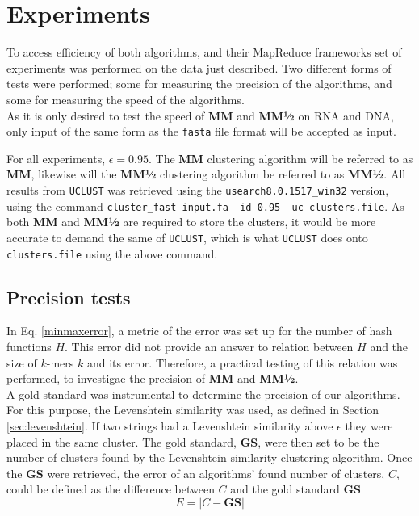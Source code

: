 \documentclass[../../main.tex]{subfiles}
\begin{document}
\section{Experiments}

To access efficiency of both algorithms, and their MapReduce frameworks set of experiments was performed on the data just described. Two different forms of tests were performed; some for measuring the precision of the algorithms, and some for measuring the speed of the algorithms.\\

As it is only desired to test the speed of {\bf MM} and {\bf MM½} on RNA and DNA, only input of the same form as the \texttt{fasta} file format will be accepted as input.
 
For all experiments, $\epsilon=0.95$. The {\bf MM} clustering algorithm will be referred to as {\bf MM}, likewise will the {\bf MM½} clustering algorithm be referred to as {\bf MM½}. All results from {\tt UCLUST} was retrieved using the {\tt usearch8.0.1517\_win32} version, using the command {\tt cluster\_fast input.fa -id 0.95 -uc clusters.file}. As both {\bf MM} and {\bf MM½} are required to store the clusters, it would be more accurate to demand the same of {\tt UCLUST}, which is what {\tt UCLUST} does onto {\tt clusters.file} using the above command.

\subsection{Precision tests}

In Eq. \ref{minmaxerror}, a metric of the error was set up for the number of hash functions $H$. This error did not provide an answer to relation between $H$ and the size of $k$-mers $k$ and its error. Therefore, a practical testing of this relation was performed, to investigae the precision of {\bf MM} and {\bf MM½}.\\

A gold standard was instrumental to determine the precision of our algorithms. For this purpose, the Levenshtein similarity was used, as defined in Section \ref{sec:levenshtein}. If two strings had a Levenshtein similarity above $\epsilon$ they were placed in the same cluster. The gold standard, \textbf{GS}, were then set to be the number of clusters found by the Levenshtein similarity clustering algorithm. Once the \textbf{GS} were retrieved, the error of an algorithms' found number of clusters, $C$, could be defined as the difference between $C$ and the gold standard \textbf{GS}
$$
E = | C - \mathbf{GS}|
$$
\end{document}
